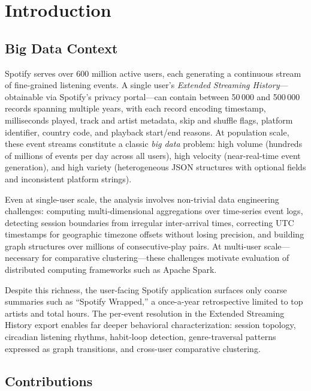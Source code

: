 \documentclass[conference]{IEEEtran}
\begin{document}
\section{Introduction}

\subsection{Big Data Context}

Spotify serves over 600 million active users, each generating a continuous
stream of fine-grained listening events. A single user's \emph{Extended
Streaming History}—obtainable via Spotify's privacy portal—can contain
between 50\,000 and 500\,000 records spanning multiple years, with each
record encoding timestamp, milliseconds played, track and artist metadata,
skip and shuffle flags, platform identifier, country code, and playback
start/end reasons. At population scale, these event streams constitute a
classic \emph{big data} problem: high volume (hundreds of millions of events
per day across all users), high velocity (near-real-time event generation),
and high variety (heterogeneous JSON structures with optional fields and
inconsistent platform strings).

Even at single-user scale, the analysis involves non-trivial data engineering
challenges: computing multi-dimensional aggregations over time-series event
logs, detecting session boundaries from irregular inter-arrival times,
correcting UTC timestamps for geographic timezone offsets without losing
precision, and building graph structures over millions of consecutive-play
pairs. At multi-user scale—necessary for comparative clustering—these
challenges motivate evaluation of distributed computing frameworks such as
Apache Spark.

Despite this richness, the user-facing Spotify application surfaces only
coarse summaries such as ``Spotify Wrapped,'' a once-a-year retrospective
limited to top artists and total hours. The per-event resolution in the
Extended Streaming History export enables far deeper behavioral
characterization: session topology, circadian listening rhythms, habit-loop
detection, genre-traversal patterns expressed as graph transitions, and
cross-user comparative clustering.

\subsection{Contributions}
\end{document}
